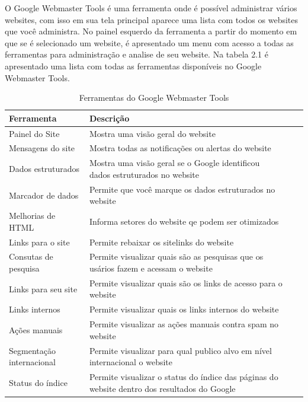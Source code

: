 \documentclass[
	12pt,				%
	openright,			%
	twoside,			%
	a4paper,			%
	english,			%
	french,				%
	spanish,			%
	brazil				%
	]{abntex2}
\begin{document}
O Google Webmaster Tools é uma ferramenta onde é possível administrar vários websites, com isso em sua tela principal aparece uma lista com todos os websites que você administra. No painel esquerdo da ferramenta a partir do momento em que se é selecionado um website, é apresentado um menu com acesso a todas as ferramentas para administração e analise de seu website. Na tabela 2.1 é apresentado uma lista com todas as ferramentas disponíveis no Google Webmaster Tools.

\begin{table}[htb]
\ABNTEXfontereduzida
\caption[Ferramentas do Google Webmaster Tools]{Ferramentas do Google Webmaster Tools}
\label{tab-nivinv}
\begin{center}
\begin{tabular}{p{2.6cm}|p{6.0cm}|p{2.25cm}|p{3.40cm}}
   \textbf{Ferramenta} & \textbf{Descrição} \\
    \hline
    Painel do Site & Mostra uma visão geral do website \\
    \hline
    Mensagens do site & Mostra todas as notificações ou alertas do website \\
    \hline
    Dados estruturados & Mostra uma visão geral se o Google identificou dados estruturados no website \\
    \hline
    Marcador de dados & Permite que você marque os dados estruturados no website \\
    \hline
    Melhorias de HTML & Informa setores do website qe podem ser otimizados \\
    \hline
    Links para o site & Permite rebaixar os sitelinks do website \\
    \hline
    Consutas de pesquisa & Permite visualizar quais são as pesquisas que os usários fazem e acessam o website \\
    \hline
    Links para seu site & Permite visualizar quais são os links de acesso para o website \\
    \hline
    Links internos & Permite visualizar quais os links internos do website \\
    \hline
    Ações manuais & Permite visualizar as ações manuais contra spam no website \\
    \hline
    Segmentação internacional & Permite visualizar para qual publico alvo em nível internacional o website \\
    \hline
    Status do índice & Permite visualizar o status do índice das páginas do website dentro dos resultados do Google \\

\end{tabular}
\end{center}
\end{table}
\end{document}
